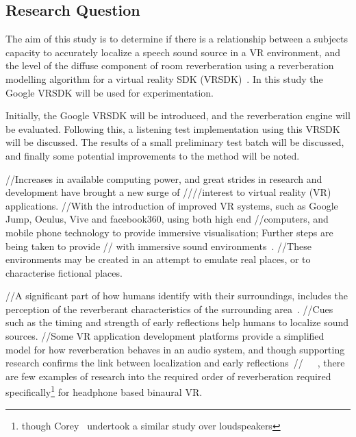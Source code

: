 \documentclass[paper=a4, fontsize=10pt, font=arial]{scrartcl} %
\numberwithin{equation}{section} %
\numberwithin{figure}{section} %
\numberwithin{table}{section} %
\begin{document}
\subsection{Research Question}

The aim of this study is to determine if there is a relationship between a subjects capacity to accurately localize a speech sound source in a VR environment, and the level of the diffuse component of room reverberation using a reverberation modelling algorithm for a virtual reality SDK (VRSDK)~\cite{googlevr2016}. In this study the Google VRSDK will be used for experimentation.

Initially, the Google VRSDK will be introduced, and the reverberation engine will be evaluated. 
Following this, a listening test implementation using this VRSDK will be discussed. The results of a small preliminary test batch will be discussed, and finally some potential improvements to the method will be noted.
  
//Increases in available computing power, and great strides in research and development have brought a new surge of ////interest to virtual reality (VR) applications. 
//With the introduction of improved VR systems, such as Google Jump, Oculus, Vive and facebook360, using both high end //computers, and mobile phone technology to provide immersive visualisation; Further steps are being taken to provide // with immersive sound environments~\cite{OculusCo41online}. 
//These environments may be created in an  attempt to emulate real places, or to characterise fictional places.\par

//A significant part of how humans identify with their surroundings, includes the perception of the reverberant characteristics of the surrounding area~\cite{rumsey2012spatial}. 
//Cues such as the timing and strength of early reflections help humans to localize sound sources. 
//Some VR application development platforms provide a simplified model for how reverberation behaves in an audio system, and though supporting research confirms the link between localization and early reflections~\cite{Begault1995}//~\cite{rumsey2012spatial}~\cite{Blauert1997}~\cite{Wiggins2004}, there are few examples of research into the required order of reverberation required specifically\footnote{though Corey~\cite{Corey2002} undertook a similar study over loudspeakers} for headphone based binaural VR.\par

\end{document}
